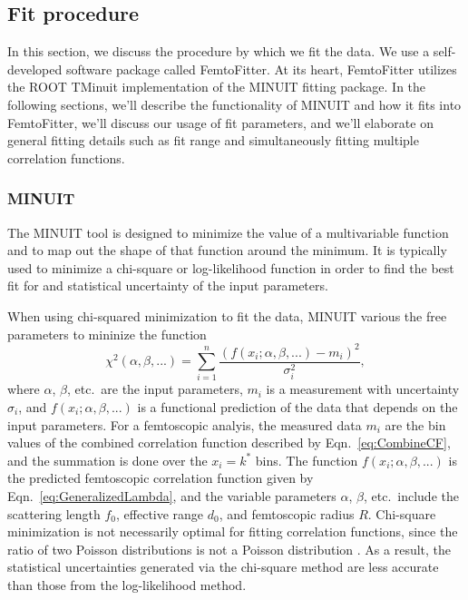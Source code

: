 \subsection{Fit procedure}
\label{sec:FitProcedure}

In this section, we discuss the procedure by which we fit the data.
We use a self-developed software package called FemtoFitter.
At its heart, FemtoFitter utilizes the ROOT TMinuit implementation of the MINUIT \cite{James:2004xla} fitting package.
In the following sections, we'll describe the functionality of MINUIT and how it fits into FemtoFitter, we'll discuss our usage of fit parameters, and we'll elaborate on general fitting details such as fit range and simultaneously fitting multiple correlation functions.


\subsubsection{MINUIT}
\label{sec:MINUIT}
The MINUIT tool is designed to minimize the value of a multivariable function and to map out the shape of that function around the minimum.
It is typically used to minimize a chi-square or log-likelihood function in order to find the best fit for and statistical uncertainty of the input parameters.

When using chi-squared minimization to fit the data, MINUIT various the free parameters to mininize the function
\begin{equation}
\label{eq:Chisquare}
\chi^2(\alpha, \beta, ...) = \sum_{i=1}^{n} \frac{(f(x_i; \alpha, \beta, ...)-m_i)^2}{\sigma^2_i},
\end{equation}
where $\alpha$, $\beta$, etc.\ are the input parameters, $m_i$ is a measurement with uncertainty $\sigma_i$, and $f(x_i; \alpha, \beta, ...)$ is a functional prediction of the data that depends on the input parameters.
For a femtoscopic analyis, the measured data $m_i$ are the bin values of the combined correlation function described by Eqn.\ \ref{eq:CombineCF}, and the summation is done over the $x_i = k^*$ bins.
The function $f(x_i; \alpha, \beta, ...)$ is the  predicted femtoscopic correlation function given by Eqn.\ \ref{eq:GeneralizedLambda}, and the variable parameters $\alpha$, $\beta$, etc.\ include the scattering length $f_0$, effective range $d_0$, and femtoscopic radius $R$.
Chi-square minimization is not necessarily optimal for fitting correlation functions, since the ratio of two Poisson distributions is not a Poisson distribution \cite{Lisa:2005dd}.
As a result, the statistical uncertainties generated via the chi-square method are less accurate than those from the log-likelihood method.

